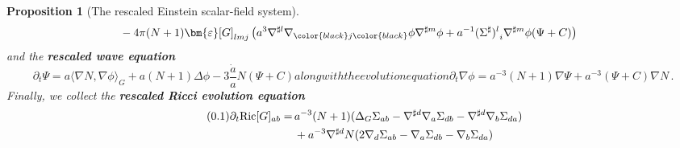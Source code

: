 \documentclass[11pt,leqno,textwidth=10cm]{amsart}
\numberwithin{equation}{section}
\theoremstyle{definition}
\theoremstyle{plain}
\newtheorem{prop}[definition]{Proposition}
\newcommand{\1}{\mathbbm{1}}
\newcommand{\Ric}{\text{\normalfont{Ric}}}
\renewcommand{\epsilon}{\varepsilon}
\newcommand{\del}{\partial}
\newcommand{\Lap}{\Delta}
\newcommand{\numberthis}{\addtocounter{equation}{1}\tag{\theequation}}
\renewcommand{\theequation}{\arabic{section}.\arabic{equation}}
\newcommand{\epsilonLC}{\bm{\epsilon}}
\newcommand{\change}[1]{\color{black}#1\color{black}}
\newcommand{\deletemath}[1]{}
\begin{document}
\begin{prop}[The rescaled Einstein scalar-field system]
\begin{subequations}
\begin{align*}
&\,-4\pi(N+1)\epsilonLC[G]_{lmj}\left(a^3\nabla^{\sharp l}\nabla_{\change{j}}\phi\nabla^{\sharp m}\phi+a^{-1}{(\Sigma^\sharp)^l}_i\nabla^{\sharp m}\phi(\Psi+C)\right)%
\end{align*}
\end{subequations}
and the \textbf{rescaled wave equation}
\begin{subequations}
\begin{equation}\label{eq:REEqWave}
\del_t\Psi=a\langle\nabla N,\nabla\phi\rangle_G+a(N+1)\Lap\phi-3\frac{\dot{a}}{a}N(\Psi+C)
\end{equation}
along with the evolution equation
\begin{equation}\label{eq:REEqNablaPhi}
\del_t\nabla\phi=a^{-3}(N+1)\nabla\Psi+a^{-3}(\Psi+C)\nabla N\,.
\end{equation}
\end{subequations}
Finally, we collect the \textbf{rescaled Ricci evolution equation}
\begin{align*}
\numberthis\label{eq:REEqRic}\del_t\Ric[G]_{ab}%
=&\,a^{-3}(N+1)(\Lap_G\Sigma_{ab}-\nabla^{\sharp d}\nabla_a\Sigma_{db}-\nabla^{\sharp d}\nabla_b\Sigma_{da})\\
&\,+a^{-3}\nabla^{\sharp d}N(2\nabla_d\Sigma_{ab}-\nabla_a\Sigma_{db}-\nabla_b\Sigma_{da})\\

\end{align*}
\end{prop}
\end{document}
